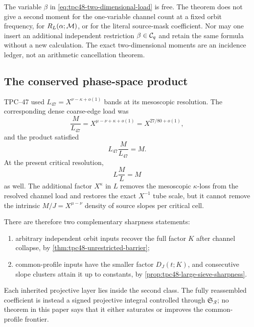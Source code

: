 \begin{remark}
The variable \(\beta\) in \eqref{eq:tpc48-two-dimensional-load} is
free.  The theorem does not give a second moment for the one-variable
channel count at a fixed orbit frequency, for
\(R_L(\alpha;\mathcal M)\), or for the literal source-mask coefficient.
Nor may one insert an additional independent restriction
\(\beta\in\mathcal C_q\) and retain the same formula without a new
calculation.  The exact two-dimensional moments are an incidence
ledger, not an arithmetic cancellation theorem.
\end{remark}

\subsection{The conserved phase-space product}

TPC--47 used \(L_{47}=X^{\nu-\kappa+o(1)}\) bands at its mesoscopic
resolution.  The corresponding dense coarse-edge load was
\begin{equation}
 \frac M{L_{47}}
 =X^{\mu-\nu+\kappa+o(1)}
 =X^{27/80+o(1)},
 \label{eq:tpc48-tpc47-load}
\end{equation}
and the product satisfied
\begin{equation}
 L_{47}\frac M{L_{47}}=M.
 \label{eq:tpc48-tpc47-phase-product}
\end{equation}
At the present critical resolution,
\begin{equation}
 L\frac ML=M
 \label{eq:tpc48-critical-phase-product}
\end{equation}
as well.  The additional factor \(X^\kappa\) in \(L\) removes the
mesoscopic \(\kappa\)-loss from the resolved channel load and restores
the exact \(X^{-1}\) tube scale, but it cannot remove the intrinsic
\(M/J=X^{\mu-\nu}\) density of source slopes per critical cell.

There are therefore two complementary sharpness statements:
\begin{enumerate}[label=\textup{(\roman*)},leftmargin=2.4em]
 \item arbitrary independent orbit inputs recover the full factor
       \(K\) after channel collapse, by
       \cref{thm:tpc48-unrestricted-barrier};
 \item common-profile inputs have the smaller factor \(D_J(t;K)\),
       and consecutive slope clusters attain it up to constants, by
       \cref{prop:tpc48-large-sieve-sharpness}.
\end{enumerate}
Each inherited projective layer lies inside the second class.  The
fully reassembled coefficient is instead a signed projective integral
controlled through \(\mathfrak S_{\mathscr R}\); no theorem in this
paper says that it either saturates or improves the common-profile
frontier.
